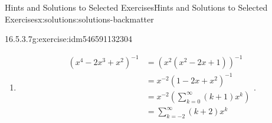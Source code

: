 \documentclass[oneside,10pt,]{book}
\numberwithin{equation}{section}
\begin{document}
\begin{solutions-chapter}{Hints and Solutions to Selected Exercises}{}{Hints and Solutions to Selected Exercises}{}{}{x:solutions:solutions-backmatter}
\begin{divisionsolution}{16.5.3.7}{}{g:exercise:idm546591132304}
\begin{enumerate}[label=(\alph*)]
\begin{equation*}
\begin{split}
\end{split}\text{.}
\end{equation*}
%
\item{}%
\begin{equation*}
\begin{split}
\left(x^4-2 x^3+x^2\right)^{-1} & =\left(x^2 \left(x^2-2 x+1\right)\right)^{-1}\\
&=x^{-2}\left(1-2x+x^2\right)^{-1}\\
& =x^{-2}\left(\sum_{k=0}^{\infty } (k+1) x^k\right)\\
&=\sum_{k=-2}^{\infty} (k+2) x^k\\
\end{split}\text{.}
\end{equation*}
%
\end{enumerate}
%
\end{divisionsolution}%
\end{solutions-chapter}
%
%
\typeout{************************************************}
\typeout{************************************************}
%
\end{document}
